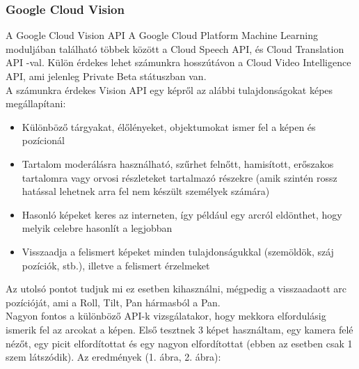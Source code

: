 \subsubsection{Google Cloud Vision}
A Google Cloud Vision API \cite{GoogleCloudVision} A Google Cloud Platform Machine Learning moduljában található többek között a Cloud Speech API, és Cloud Translation API -val. Külön érdekes lehet számunkra hosszútávon a Cloud Video Intelligence API, ami jelenleg Private Beta státuszban van.
\\A számunkra érdekes Vision API egy képről az alábbi tulajdonságokat képes megállapítani:
\begin{itemize}
\item Különböző tárgyakat, élőlényeket, objektumokat ismer fel a képen és pozícionál
\item Tartalom moderálásra használható, szűrhet felnőtt, hamisított, erőszakos tartalomra vagy orvosi részleteket tartalmazó részekre (amik szintén rossz hatással lehetnek arra fel nem készült személyek számára)
\item Hasonló képeket keres az interneten, így például egy arcról eldönthet, hogy melyik celebre hasonlít a legjobban
\item Visszaadja a felismert képeket minden tulajdonságukkal (szemöldök, száj pozíciók, stb.), illetve a felismert érzelmeket
\end{itemize}

Az utolsó pontot tudjuk mi ez esetben kihasználni, mégpedig a visszaadaott arc pozícióját, ami a Roll, Tilt, Pan hármasból a Pan.
\\Nagyon fontos a különböző API-k vizsgálatakor, hogy mekkora elfordulásig ismerik fel az arcokat a képen. Első tesztnek 3 képet használtam, egy kamera felé nézőt, egy picit elfordítottat és egy nagyon elfordítottat (ebben az esetben csak 1 szem látszódik).
Az eredmények (1. ábra, 2. ábra): \\

